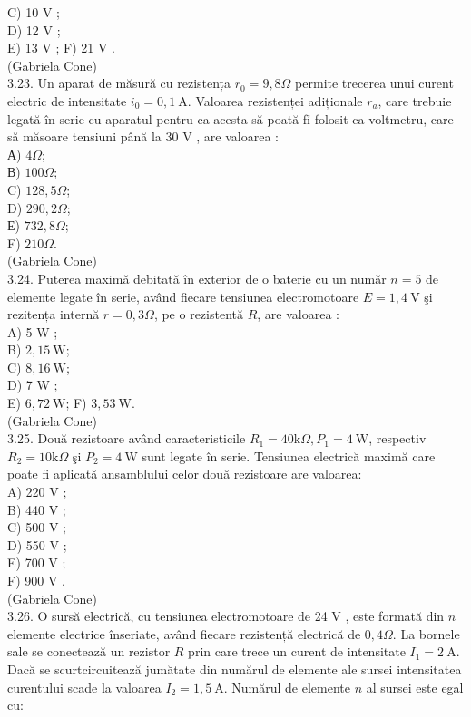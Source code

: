 \documentclass[10pt]{article}
\begin{document}
C) 10 V ;\\
D) 12 V ;\\
E) 13 V ; F) 21 V .\\
(Gabriela Cone)\\
3.23. Un aparat de măsură cu rezistența $r_{0}=9,8 \Omega$ permite trecerea unui curent electric de intensitate $i_{0}=0,1 \mathrm{~A}$. Valoarea rezistenței adiționale $r_{a}$, care trebuie legată în serie cu aparatul pentru ca acesta să poată fỉ folosit ca voltmetru, care să măsoare tensiuni până la 30 V , are valoarea :\\
А) $4 \Omega$;\\
В) $100 \Omega$;\\
C) $128,5 \Omega$;\\
D) $290,2 \Omega$;\\
Е) $732,8 \Omega$;\\
F) $210 \Omega$.\\
(Gabriela Cone)\\
3.24. Puterea maximă debitată în exterior de o baterie cu un număr $n=5$ de elemente legate în serie, având fiecare tensiunea electromotoare $E=1,4 \mathrm{~V}$ şi rezitența internă $r=0,3 \Omega$, pe o rezistentă $R$, are valoarea :\\
A) 5 W ;\\
B) $2,15 \mathrm{~W}$;\\
C) $8,16 \mathrm{~W}$;\\
D) 7 W ;\\
E) $6,72 \mathrm{~W}$; F) $3,53 \mathrm{~W}$.\\
(Gabriela Cone)\\
3.25. Două rezistoare având caracteristicile $R_{1}=40 \mathrm{k} \Omega, P_{1}=4 \mathrm{~W}$, respectiv $R_{2}=10 \mathrm{k} \Omega$ şi $P_{2}=4 \mathrm{~W}$ sunt legate în serie. Tensiunea electrică maximă care poate fi aplicată ansamblului celor două rezistoare are valoarea:\\
A) 220 V ;\\
B) 440 V ;\\
C) 500 V ;\\
D) 550 V ;\\
E) 700 V ;\\
F) 900 V .\\
(Gabriela Cone)\\
3.26. O sursă electrică, cu tensiunea electromotoare de 24 V , este formată din $n$ elemente electrice înseriate, având fiecare rezistență electrică de $0,4 \Omega$. La bornele sale se conectează un rezistor $R$ prin care trece un curent de intensitate $I_{1}=2 \mathrm{~A}$. Dacă se scurtcircuitează jumătate din numărul de elemente ale sursei intensitatea curentului scade la valoarea $I_{2}=1,5 \mathrm{~A}$. Numărul de elemente $n$ al sursei este egal cu:\\
\end{document}
